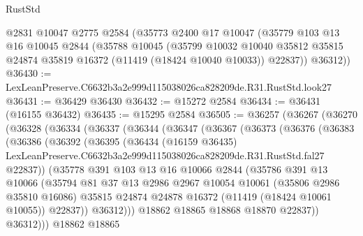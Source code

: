\begin{lexlean}{RustStd}
\begin{coremodule}
    @2831
    @10047
    @2775
    @2584
    (@35773
      @2400
      @17
      @10047
      (@35779
        @103
        @13
        @16
        @10045
        @2844
        (@35788
          @10045
          (@35799
            @10032
            @10040
            @35812
            @35815
            @24874
            @35819
            @16372
            (@11419 (@18424 @10040 @10033))
            @22837))
        @36312))
@36430 := LexLeanPreserve.C6632b3a2e999d115038026ca828209de.R31.RustStd.look27
@36431 := @36429 @36430
@36432 := @15272 @2584
@36434 := @36431 (@16155 @36432)
@36435 := @15295 @2584
@36505 := @36257
    (@36267
      (@36270
        (@36328
          (@36334
            (@36337
              (@36344
                (@36347
                  (@36367
                    (@36373
                      (@36376
                        (@36383
                          (@36386
                            (@36392
                              (@36395
                                (@36434
                                  (@16159 @36435)
                                  LexLeanPreserve.C6632b3a2e999d115038026ca828209de.R31.RustStd.fal27
                                  @22837))
                              (@35778
                                @391
                                @103
                                @13
                                @16
                                @10066
                                @2844
                                (@35786
                                  @391
                                  @13
                                  @10066
                                  (@35794
                                    @81
                                    @37
                                    @13
                                    @2986
                                    @2967
                                    @10054
                                    @10061
                                    (@35806 @2986 @35810 @16086)
                                    @35815
                                    @24874
                                    @24878
                                    @16372
                                    (@11419 (@18424 @10061 @10055))
                                    @22837))
                                @36312)))
                          @18862
                          @18865
                          @18868
                          @18870
                          @22837))
                      @36312)))
                @18862
                @18865

\end{coremodule}
\end{lexlean}
